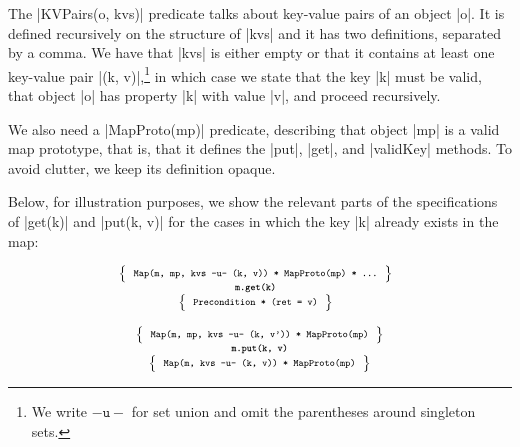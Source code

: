 The \jsinline|KVPairs(o, kvs)| predicate talks about key-value pairs of an object \jsinline|o|. 
It is defined recursively on the structure of \jsinline|kvs| and it has two definitions, separated by a comma. 
We have that \jsinline|kvs| is either empty or that it contains at least one key-value pair \jsinline|(k, v)|,\footnote{We write $\mathtt{-u-}$ for set union and omit the parentheses around singleton sets.} 
in which case we state that the key \jsinline|k| must be valid, that object \jsinline|o| has  property \jsinline|k| with value \jsinline|v|, and proceed recursively.

We also need a \jsinline|MapProto(mp)| predicate, describing that object \jsinline|mp| is a valid map prototype, that is, that it defines the \jsinline|put|, \jsinline|get|, and \jsinline|validKey| methods. To avoid clutter, we keep its definition opaque.

Below, for illustration purposes, we show the relevant parts of the specifications of \jsinline|get(k)| and \jsinline|put(k, v)| for the cases in which the key
 \jsinline|k| already exists in the map:

\smallskip
\begin{minipage}{0.475\textwidth}
\begin{displaymath} 
{\scriptsize
\hspace*{-0.2cm}
\begin{array}{c}
\left\{ {\begin{array}{c}
 \text{\texttt{Map(m, mp, kvs -u- (k, v)) * MapProto(mp) * ...}}
\end{array}} \right\} \\
%
\text{\bfseries \texttt{m.get(k)}} \\[0.2mm]
%
\left\{ {\begin{array}{c}
 \text{\texttt{Precondition * (ret = v)}} 
\end{array}} \right\}
\end{array}
} 
\end{displaymath}
\end{minipage}
\quad
\begin{minipage}{0.48\textwidth}
%
\begin{displaymath} 
{\scriptsize
\begin{array}{c}
\left\{ {\begin{array}{c}
 \text{\texttt{Map(m, mp, kvs -u- (k, v')) * MapProto(mp)}}
\end{array}} \right\} \\
%
\text{\bfseries \texttt{m.put(k, v)}} \\[0.2mm]
%
\left\{ {\begin{array}{c}
 \text{\texttt{Map(m, kvs -u- (k, v)) * MapProto(mp)}}
\end{array}} \right\}
\end{array}
} 
\end{displaymath}
\end{minipage}

